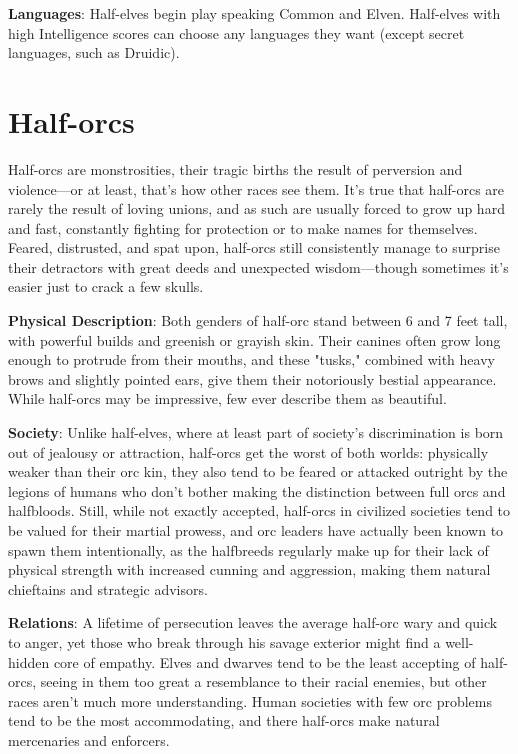 \textbf{Languages}: Half-elves begin play speaking Common and Elven. Half-elves with high Intelligence scores can choose any languages they want (except secret languages, such as Druidic).
							
\section{Half-orcs}

				
Half-orcs are monstrosities, their tragic births the result of perversion and violence---or at least, that's how other races see them. It's true that half-orcs are rarely the result of loving unions, and as such are usually forced to grow up hard and fast, constantly fighting for protection or to make names for themselves. Feared, distrusted, and spat upon, half-orcs still consistently manage to surprise their detractors with great deeds and unexpected wisdom---though sometimes it's easier just to crack a few skulls.
				
\textbf{Physical Description}: Both genders of half-orc stand between 6 and 7 feet tall, with powerful builds and greenish or grayish skin. Their canines often grow long enough to protrude from their mouths, and these "tusks," combined with heavy brows and slightly pointed ears, give them their notoriously bestial appearance. While half-orcs may be impressive, few ever describe them as beautiful.
				
\textbf{Society}: Unlike half-elves, where at least part of society's discrimination is born out of jealousy or attraction, half-orcs get the worst of both worlds: physically weaker than their orc kin, they also tend to be feared or attacked outright by the legions of humans who don't bother making the distinction between full orcs and halfbloods. Still, while not exactly accepted, half-orcs in civilized societies tend to be valued for their martial prowess, and orc leaders have actually been known to spawn them intentionally, as the halfbreeds regularly make up for their lack of physical strength with increased cunning and aggression, making them natural chieftains and strategic advisors. 
				
\textbf{Relations}: A lifetime of persecution leaves the average half-orc wary and quick to anger, yet those who break through his savage exterior might find a well-hidden core of empathy. Elves and dwarves tend to be the least accepting of half-orcs, seeing in them too great a resemblance to their racial enemies, but other races aren't much more understanding. Human societies with few orc problems tend to be the most accommodating, and there half-orcs make natural mercenaries and enforcers.
				
